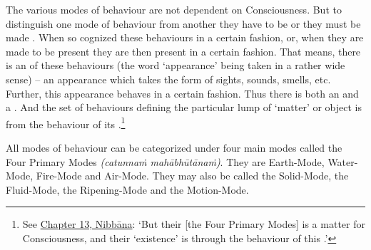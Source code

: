 The various modes of behaviour are not dependent on Consciousness. But to distinguish one mode of behaviour from another they have to be  or they must be made . When so cognized these behaviours  in a certain fashion, or, when they are made to be present they are then present in a certain fashion. That means, there is an  of these behaviours (the word `appearance' being taken in a rather wide sense) -- an appearance which takes the form of sights, sounds, smells, etc. Further, this appearance behaves in a certain fashion. Thus there is both an  and a . And the set of behaviours defining the particular lump of `matter' or object is  from the behaviour of its .\footnote{See \href{ch-13-nibbana.xml\#the-four-primary}{Chapter 13, Nibbāna}: `But their [the Four Primary Modes]  is a matter for Consciousness, and their `existence' is  through the behaviour of this .'}

All modes of behaviour can be categorized under four main modes called the Four Primary Modes \emph{(catunnaṁ mahābhūtānaṁ)}. They are Earth-Mode, Water-Mode, Fire-Mode and Air-Mode. They may also be called the Solid-Mode, the Fluid-Mode, the Ripening-Mode and the Motion-Mode.

